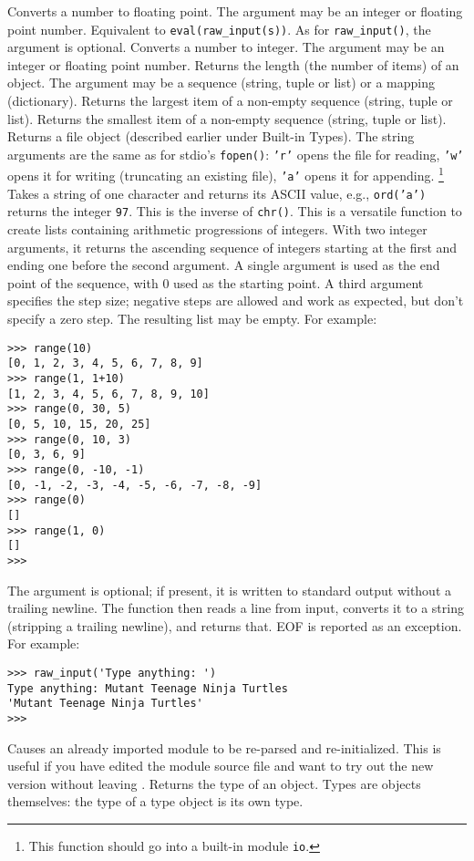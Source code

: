 \begin{description}
Converts a number to floating point.
The argument may be an integer or floating point number.
Equivalent to
{\tt eval(raw\_input(s))}.
As for
{\tt raw\_input()},
the argument is optional.
Converts a number to integer.
The argument may be an integer or floating point number.
Returns the length (the number of items) of an object.
The argument may be a sequence (string, tuple or list) or a mapping
(dictionary).
Returns the largest item of a non-empty sequence (string, tuple or list).
Returns the smallest item of a non-empty sequence (string, tuple or list).
Returns a file object (described earlier under Built-in Types).
The string arguments are the same as for stdio's
{\tt fopen()}:
{\tt 'r'}
opens the file for reading,
{\tt 'w'}
opens it for writing (truncating an existing file),
{\tt 'a'}
opens it for appending.%
\footnote{
This function should go into a built-in module
{\tt io}.
}
Takes a string of one character and returns its
ASCII value, e.g., {\tt ord('a')} returns the integer {\tt 97}.
This is the inverse of {\tt chr()}.
This is a versatile function to create lists containing arithmetic
progressions of integers.
With two integer arguments, it returns the ascending sequence of
integers starting at the first and ending one before the second
argument.
A single argument is used as the end point of the sequence, with 0 used
as the starting point.
A third argument specifies the step size; negative steps are allowed and
work as expected, but don't specify a zero step.
The resulting list may be empty.
For example:
\bcode\begin{verbatim}
>>> range(10)
[0, 1, 2, 3, 4, 5, 6, 7, 8, 9]
>>> range(1, 1+10)
[1, 2, 3, 4, 5, 6, 7, 8, 9, 10]
>>> range(0, 30, 5)
[0, 5, 10, 15, 20, 25]
>>> range(0, 10, 3)
[0, 3, 6, 9]
>>> range(0, -10, -1)
[0, -1, -2, -3, -4, -5, -6, -7, -8, -9]
>>> range(0)
[]
>>> range(1, 0)
[]
>>> 
\end{verbatim}\ecode
{}
The argument is optional; if present, it is written to standard output
without a trailing newline.
The function then reads a line from input, converts it to a string
(stripping a trailing newline), and returns that.
EOF is reported as an exception.
For example:
\bcode\begin{verbatim}
>>> raw_input('Type anything: ')
Type anything: Mutant Teenage Ninja Turtles
'Mutant Teenage Ninja Turtles'
>>> 
\end{verbatim}\ecode
{}
Causes an already imported module to be re-parsed and re-initialized.
This is useful if you have edited the module source file and want to
try out the new version without leaving {\Python}.
Returns the type of an object.
Types are objects themselves:
the type of a type object is its own type.
\end{description}
